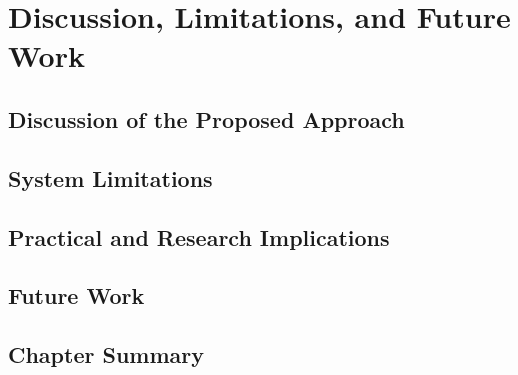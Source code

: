 \chapter{Discussion, Limitations, and Future Work}
\section{Discussion of the Proposed Approach}
\section{System Limitations}
\section{Practical and Research Implications}
\section{Future Work}
\section{Chapter Summary}
